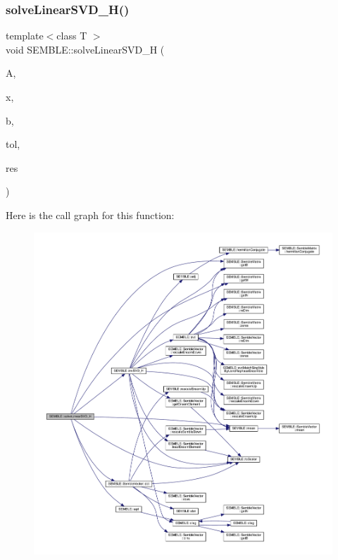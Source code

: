\subsubsection{\texorpdfstring{solveLinearSVD\_H()}{solveLinearSVD\_H()}\hspace{0.1cm}{\footnotesize\ttfamily [1/2]}}
{\footnotesize\ttfamily template$<$class T $>$ \\
void S\+E\+M\+B\+L\+E\+::solve\+Linear\+S\+V\+D\+\_\+H (\begin{DoxyParamCaption}\item[{const \mbox{\hyperlink{structSEMBLE_1_1SembleMatrix}{Semble\+Matrix}}$<$ T $>$ \&}]{A,  }\item[{\mbox{\hyperlink{structSEMBLE_1_1SembleVector}{Semble\+Vector}}$<$ T $>$ \&}]{x,  }\item[{const \mbox{\hyperlink{structSEMBLE_1_1SembleVector}{Semble\+Vector}}$<$ T $>$ \&}]{b,  }\item[{const double}]{tol,  }\item[{double \&}]{res }\end{DoxyParamCaption})}

Here is the call graph for this function\+:
\nopagebreak
\begin{figure}[H]
\begin{center}
\leavevmode
\includegraphics[width=350pt]{d7/dfd/namespaceSEMBLE_a13a03156f292e8edb0d4d9e26a3c8de2_cgraph}
\end{center}
\end{figure}
\mbox{\label{namespaceSEMBLE_a263ad714a1484ebb46be58d5ace2c796}} 
